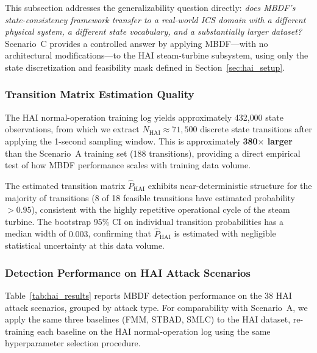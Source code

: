 \documentclass[manuscript,screen,review]{acmart}
\begin{document}
This subsection addresses the generalizability question
directly: \emph{does MBDF's state-consistency framework
transfer to a real-world ICS domain with a different
physical system, a different state vocabulary, and a
substantially larger dataset?} Scenario~C provides a
controlled answer by applying MBDF---with no architectural
modifications---to the HAI steam-turbine subsystem,
using only the state discretization and feasibility mask
defined in Section~\ref{sec:hai_setup}.

\subsubsection{Transition Matrix Estimation Quality}
\label{sec:hai_matrix}

The HAI normal-operation training log yields approximately
432{,}000 state observations, from which we extract
$N_{\mathrm{HAI}} \approx 71{,}500$ discrete state
transitions after applying the 1-second sampling window.
This is approximately \textbf{380$\times$ larger} than
the Scenario~A training set (188 transitions), providing
a direct empirical test of how MBDF performance scales
with training data volume.

The estimated transition matrix $\hat{P}_{\mathrm{HAI}}$
exhibits near-deterministic structure for the majority of
transitions (8 of 18 feasible transitions have estimated
probability $> 0.95$), consistent with the highly
repetitive operational cycle of the steam turbine. The
bootstrap 95\% CI on individual transition probabilities
has a median width of $0.003$, confirming that
$\hat{P}_{\mathrm{HAI}}$ is estimated with negligible
statistical uncertainty at this data volume.

\subsubsection{Detection Performance on HAI Attack
Scenarios}
\label{sec:hai_detection}

Table~\ref{tab:hai_results} reports MBDF detection
performance on the 38 HAI attack scenarios, grouped by
attack type. For comparability with Scenario~A, we apply
the same three baselines (FMM, STBAD, SMLC) to the HAI
dataset, re-training each baseline on the HAI
normal-operation log using the same hyperparameter
selection procedure.
\end{document}
